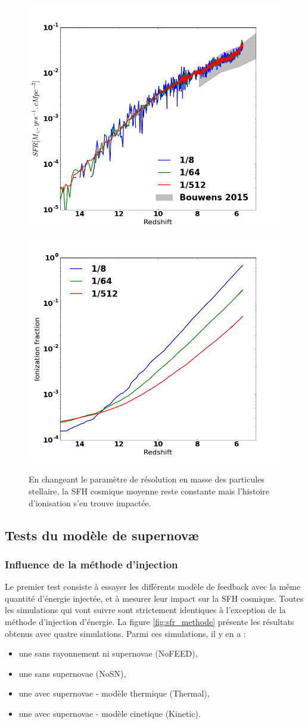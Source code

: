 \begin{figure}
        \includegraphics[width=.5\textwidth]{img/02/Mstar_SFH.png} 
        \includegraphics[width=.5\textwidth]{img/02/Mstar_xion.png} 
        \caption[Masses des étoiles]{En changeant le paramètre de résolution en masse des particules stellaire, la \ac{SFH} cosmique moyenne reste constante mais l'histoire d'ionisation s'en trouve impactée.
 		\label{fig:mstar}}
\end{figure}

\clearpage
\subsection{Tests du modèle de supernovæ}
\label{sec:testsncosmo}

\subsubsection{Influence de la méthode d'injection}
\label{sec:snmethod}

Le premier test consiste à essayer les différents modèle de feedback avec la même quantité d'énergie injectée, et à mesurer leur impact sur la \ac{SFH} cosmique.
Toutes les simulations qui vont suivre sont strictement identiques à l'exception de la méthode d'injection d'énergie.
La figure \ref{fig:sfr_methode} présente les résultats obtenus avec quatre simulations.
Parmi ces simulations, il y en a :
\begin{itemize}
\item une sans rayonnement ni supernovae (NoFEED),
\item une sans supernovae (NoSN),
\item une avec supernovae - modèle thermique (Thermal),
\item une avec supernovae - modèle cinetique (Kinetic).
\end{itemize}

